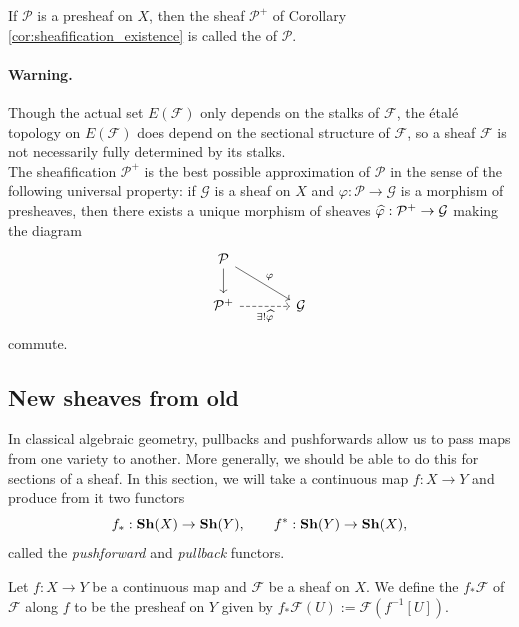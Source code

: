 \begin{defn}
	If $\mathcal{P}$ is a presheaf on $X$, then the sheaf $\mathcal{P}^+$ of Corollary \ref{cor:sheafification_existence} is called the  of $\mathcal{P}$.
\end{defn}

\paragraph{Warning.} Though the actual set $E(\mathcal{F})$ only depends on the stalks of $\mathcal{F}$, the \'etal\'e topology on $E(\mathcal{F})$ does depend on the sectional structure of $\mathcal{F}$, so a sheaf $\mathcal{F}$ is not necessarily fully determined by its stalks.\\

The sheafification $\mathcal{P}^+$ is the best possible approximation of $\mathcal{P}$ in the sense of the following universal property: if $\mathcal{G}$ is a sheaf on $X$ and $\varphi:\mathcal{P} \to \mathcal{G}$ is a morphism of presheaves, then there exists a unique morphism of sheaves $\widehat{\varphi}:\mathcal{P}^+ \to \mathcal{G}$ making the diagram 
\[
	\begin{tikzcd}[column sep=large]
		\mathcal{P} \dar \ar[rd, "\varphi"] &  \\
		\mathcal{P}^+ \rar[dashed, "\exists!\wh\varphi"'] & \mathcal{G}
	\end{tikzcd}
\]
commute.


\subsection{New sheaves from old}
\label{subsec:A_2_image_functors}
In classical algebraic geometry, pullbacks and pushforwards allow us to pass maps from one variety to another. More generally, we should be able to do this for sections of a sheaf. In this section, we will take a continuous map $f:X \to Y$ and produce from it two functors
\[
	f_*: \mathbf{Sh}(X) \to \mathbf{Sh}(Y),\qquad f^* : \mathbf{Sh}(Y) \to \mathbf{Sh}(X),
\]
called the \emph{pushforward} and \emph{pullback} functors.

\begin{defn}
	Let $f: X \to Y$ be a continuous map and $\mathcal{F}$ be a sheaf on $X$. We define the  $f_*\mathcal{F}$ of $\mathcal{F}$ along $f$ to be the presheaf on $Y$ given by $f_*\mathcal{F}(U) := \mathcal{F}(f^{-1}[U])$.
\end{defn}

